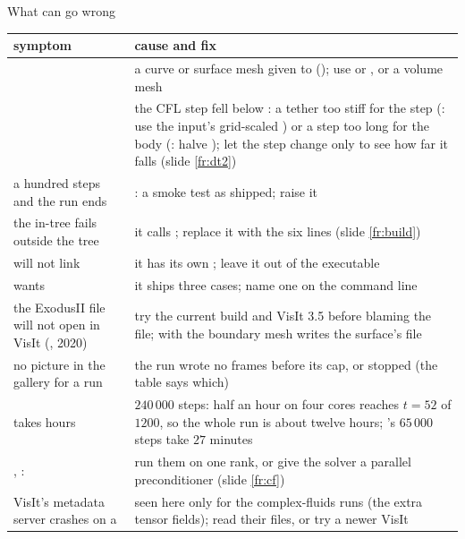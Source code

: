\documentclass[aspectratio=169,11pt]{beamer}
\begin{document}
\begin{frame}{What can go wrong}
\label{fr:wrong}
\scriptsize
\renewcommand{\arraystretch}{0.88}
\begin{tabular}{@{}L{0.36\textwidth}L{0.57\textwidth}@{}}
\toprule
symptom & cause and fix \\
\midrule
{} & a curve or surface mesh given to  (); use  or , or a volume mesh \\
 & the CFL step fell below : a tether too stiff for the step (: use the input's grid-scaled ) or a step too long for the body (: halve ); let the step change only to see how far it falls (slide \ref{fr:dt2}) \\
a hundred steps and the run ends & : a smoke test as shipped; raise it \\
the in-tree  fails outside the tree & it calls ; replace it with the six lines (slide \ref{fr:build}) \\
 will not link & it has its own ; leave it out of the executable \\
 wants  & it ships three cases; name one on the command line \\
the ExodusII file will not open in VisIt (, 2020) & try the current build and VisIt 3.5 before blaming the file;  with the boundary mesh writes the surface's file \\
no picture in the gallery for a run & the run wrote no frames before its cap, or stopped (the table says which) \\
 takes hours & $240\,000$ steps: half an hour on four cores reaches $t = 52$ of $1200$, so the whole run is about twelve hours; 's $65\,000$ steps take $27$ minutes \\
, :  & run them on one rank, or give the solver a parallel preconditioner (slide \ref{fr:cf}) \\
VisIt's metadata server crashes on a  & seen here only for the complex-fluids runs (the extra tensor fields); read their  files, or try a newer VisIt \\
\bottomrule
\end{tabular}
\end{frame}
\end{document}
